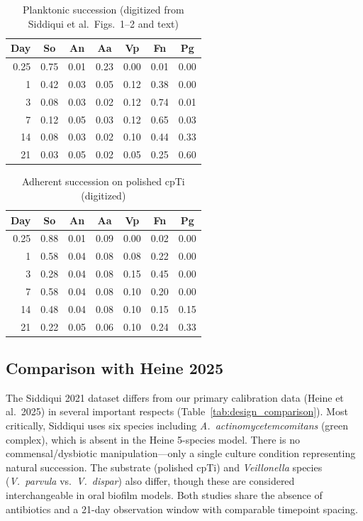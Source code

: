 \documentclass[11pt,a4paper]{article}
\begin{document}
\begin{table}[H]\centering\small
\caption{Planktonic succession (digitized from Siddiqui et al.\ Figs.\ 1--2 and text)}
\label{tab:plan_succession}
\begin{tabular}{rcccccc}
\toprule
Day & So & An & Aa & Vp & Fn & Pg \\
\midrule
0.25 & 0.75 & 0.01 & 0.23 & 0.00 & 0.01 & 0.00 \\
1    & 0.42 & 0.03 & 0.05 & 0.12 & 0.38 & 0.00 \\
3    & 0.08 & 0.03 & 0.02 & 0.12 & 0.74 & 0.01 \\
7    & 0.12 & 0.05 & 0.03 & 0.12 & 0.65 & 0.03 \\
14   & 0.08 & 0.03 & 0.02 & 0.10 & 0.44 & 0.33 \\
21   & 0.03 & 0.05 & 0.02 & 0.05 & 0.25 & 0.60 \\
\bottomrule
\end{tabular}
\end{table}

\begin{table}[H]\centering\small
\caption{Adherent succession on polished cpTi (digitized)}
\label{tab:adh_succession}
\begin{tabular}{rcccccc}
\toprule
Day & So & An & Aa & Vp & Fn & Pg \\
\midrule
0.25 & 0.88 & 0.01 & 0.09 & 0.00 & 0.02 & 0.00 \\
1    & 0.58 & 0.04 & 0.08 & 0.08 & 0.22 & 0.00 \\
3    & 0.28 & 0.04 & 0.08 & 0.15 & 0.45 & 0.00 \\
7    & 0.58 & 0.04 & 0.08 & 0.10 & 0.20 & 0.00 \\
14   & 0.48 & 0.04 & 0.08 & 0.10 & 0.15 & 0.15 \\
21   & 0.22 & 0.05 & 0.06 & 0.10 & 0.24 & 0.33 \\
\bottomrule
\end{tabular}
\end{table}

\subsection{Comparison with Heine 2025}

The Siddiqui 2021 dataset differs from our primary calibration data (Heine et al.\ 2025) in
several important respects (Table~\ref{tab:design_comparison}). Most critically, Siddiqui uses
six species including \textit{A.\ actinomycetemcomitans} (green complex), which is absent in
the Heine 5-species model. There is no commensal/dysbiotic manipulation---only a single culture
condition representing natural succession. The substrate (polished cpTi) and \textit{Veillonella}
species (\textit{V.\ parvula} vs.\ \textit{V.\ dispar}) also differ, though these are considered
interchangeable in oral biofilm models. Both studies share the absence of antibiotics and a
21-day observation window with comparable timepoint spacing.
\end{document}
